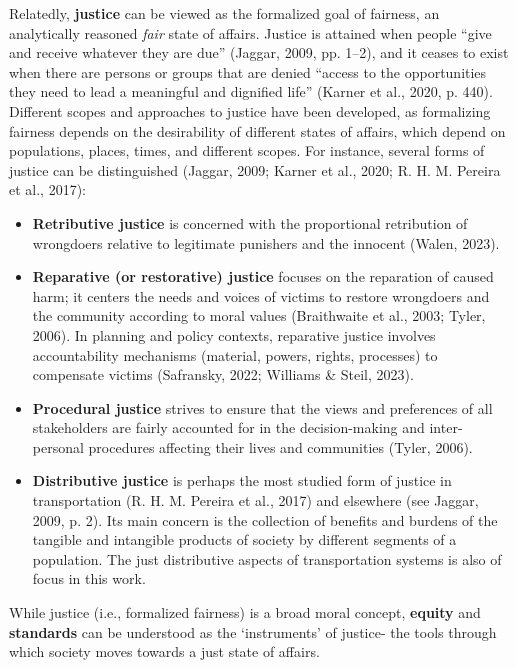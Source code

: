 \documentclass[
  letterpaper,
  DIV=11,
  numbers=noendperiod]{scrartcl}
\begin{document}
Relatedly, \textbf{justice} can be viewed as the formalized goal of
fairness, an analytically reasoned \emph{fair} state of affairs. Justice
is attained when people ``give and receive whatever they are due''
(Jaggar, 2009, pp. 1--2), and it ceases to exist when there are persons
or groups that are denied ``access to the opportunities they need to
lead a meaningful and dignified life'' (Karner et al., 2020, p. 440).
Different scopes and approaches to justice have been developed, as
formalizing fairness depends on the desirability of different states of
affairs, which depend on populations, places, times, and different
scopes. For instance, several forms of justice can be distinguished
(Jaggar, 2009; Karner et al., 2020; R. H. M. Pereira et al., 2017):

\begin{itemize}
\item
  \textbf{Retributive justice} is concerned with the proportional
  retribution of wrongdoers relative to legitimate punishers and the
  innocent (Walen, 2023).
\item
  \textbf{Reparative (or restorative) justice} focuses on the reparation
  of caused harm; it centers the needs and voices of victims to restore
  wrongdoers and the community according to moral values (Braithwaite et
  al., 2003; Tyler, 2006). In planning and policy contexts, reparative
  justice involves accountability mechanisms (material, powers, rights,
  processes) to compensate victims (Safransky, 2022; Williams \& Steil,
  2023).
\item
  \textbf{Procedural justice} strives to ensure that the views and
  preferences of all stakeholders are fairly accounted for in the
  decision-making and inter-personal procedures affecting their lives
  and communities (Tyler, 2006).
\item
  \textbf{Distributive justice} is perhaps the most studied form of
  justice in transportation (R. H. M. Pereira et al., 2017) and
  elsewhere (see Jaggar, 2009, p. 2). Its main concern is the collection
  of benefits and burdens of the tangible and intangible products of
  society by different segments of a population. The just distributive
  aspects of transportation systems is also of focus in this work.
\end{itemize}

While justice (i.e., formalized fairness) is a broad moral concept,
\textbf{equity} and \textbf{standards} can be understood as the
`instruments' of justice- the tools through which society moves towards
a just state of affairs.
\end{document}
